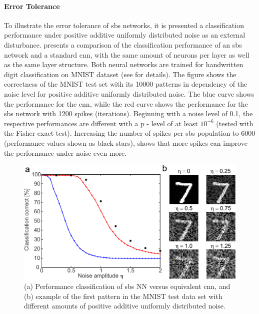 \paragraph{Error Tolerance}

To illustrate the error tolerance of \gls{sbs} networks, it is presented a classification performance under positive additive uniformly distributed noise as an external disturbance.  presents a comparison of the classification performance of an \gls{sbs} network and a standard \gls{cnn}, with the same amount of
neurons per layer as well as the same layer structure. Both neural networks are trained for handwritten digit classification on MNIST dataset \cite{lecun1998mnist} (see \cite{rotermund2019Backpropagation} for details). The figure shows the correctness of the MNIST test set with its \num[group-separator={,}]{10000} patterns in dependency of the noise level for positive additive
uniformly distributed noise. The blue curve shows the performance for
the \gls{cnn}, while the red curve shows the performance for
the \gls{sbs} network with \num[group-separator={,}]{1200} spikes (iterations). Beginning
with a noise level of 0.1, the respective performances are different
with a p - level of at least $10^{-6}$ (tested with the Fisher exact
test). Increasing the number of spikes per \gls{sbs} population to \num[group-separator={,}]{6000}
(performance values shown as black stars), shows that more spikes can
improve the performance under noise even more.

\begin{figure}
	\centering
	\includegraphics[width=0.5\columnwidth]{./chapters/sbs_accelerator/figures/sbs_robustnes.pdf}
	\caption{(a) Performance classification of \gls{sbs} NN versus equivalent \gls{cnn}, and (b) example of the first pattern in the MNIST test data set with different amounts of positive additive uniformly distributed noise.}
	\label{fig:robustnes_sbs}
\end{figure}
\FloatBarrier

